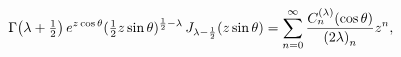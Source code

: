 \[\mathop{\Gamma\/}\nolimits\!\left(\lambda+\tfrac{1}{2}\right)e^{z\mathop{\cos%
\/}\nolimits\theta}(\tfrac{1}{2}z\mathop{\sin\/}\nolimits\theta)^{\frac{1}{2}-%
\lambda}\mathop{J_{\lambda-\frac{1}{2}}\/}\nolimits\!\left(z\mathop{\sin\/}%
\nolimits\theta\right)=\sum_{n=0}^{\infty}\frac{\mathop{C^{(\lambda)}_{n}\/}%
\nolimits\!\left(\mathop{\cos\/}\nolimits\theta\right)}{\left(2\lambda\right)_%
{n}}z^{n},\]